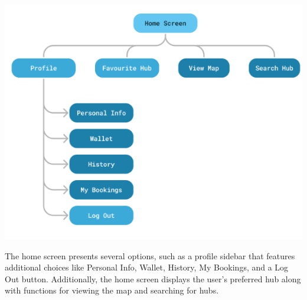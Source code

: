 \documentclass[11pt]{article}
\begin{document}
\begin{center}
    \includegraphics*[scale=0.75]{home-screen-interface.png}
\end{center}
The home screen presents several options, such as a profile sidebar that features additional choices like Personal Info, Wallet, History, My Bookings, and a Log Out button. Additionally, the home screen displays the user's preferred hub along with functions for viewing the map and searching for hubs.
\end{document}
